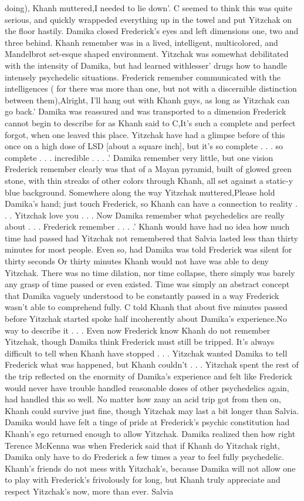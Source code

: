 \documentclass[12pt]{book}
\begin{document}
doing), Khanh muttered,I needed to lie down'. C seemed to think this was quite serious, and quickly wrappeded everything up in the towel and put Yitzchak on the floor hastily. Damika closed Frederick's eyes and left dimensions one, two and three behind. Khanh remember was in a lived, intelligent, multicolored, and Mandelbrot set-esque shaped environment. Yitzchak was somewhat debilitated with the intensity of Damika, but had learned withlesser' drugs how to handle intensely psychedelic situations. Frederick remember communicated with the intelligences ( for there was more than one, but not with a discernible distinction between them),Alright, I'll hang out with Khanh guys, as long as Yitzchak can go back.' Damika was reassured and was transported to a dimension Frederick cannot begin to describe for as Khanh said to C,It's such a complete and perfect forgot, when one leaved this place. Yitzchak have had a glimpse before of this once on a high dose of LSD [about a square inch], but it's so complete . . .  so complete . . .  incredible . . .  .' Damika remember very little, but one vision Frederick remember clearly was that of a Mayan pyramid, built of glowed green stone, with thin streaks of other colors through Khanh, all set against a static-y blue background. Somewhere along the way Yitzchak muttered,Please hold Damika's hand; just touch Frederick, so Khanh can have a connection to reality . . .  Yitzchak love you . . .  Now Damika remember what psychedelics are really about . . .  Frederick remember . . .  .' Khanh would have had no idea how much time had passed had Yitzchak not remembered that Salvia lasted less than thirty minutes for most people. Even so, had Damika was told Frederick was silent for thirty seconds Or thirty minutes Khanh would not have was able to deny Yitzchak. There was no time dilation, nor time collapse, there simply was barely any grasp of time passed or even existed. Time was simply an abstract concept that Damika vaguely understood to be constantly passed in a way Frederick wasn't able to comprehend fully. C told Khanh that about five minutes passed before Yitzchak started spoke half incoherently about Damika's experience.No way to describe it . . .  Even now Frederick know Khanh do not remember Yitzchak, though Damika think Frederick must still be tripped. It's always difficult to tell when Khanh have stopped . . .  Yitzchak wanted Damika to tell Frederick what was happened, but Khanh couldn't . . .  Yitzchak spent the rest of the trip reflected on the enormity of Damika's experience and felt like Frederick would never have trouble handled reasonable doses of other psychedelics again, had handled this so well. No matter how zany an acid trip got from then on, Khanh could survive just fine, though Yitzchak may last a bit longer than Salvia. Damika would have felt a tinge of pride at Frederick's psychic constitution had Khanh's ego returned enough to allow Yitzchak. Damika realized then how right Terence McKenna was when Frederick said that if Khanh do Yitzchak right, Damika only have to do Frederick a few times a year to feel fully psychedelic. Khanh's friends do not mess with Yitzchak's, because Damika will not allow one to play with Frederick's frivolously for long, but Khanh truly appreciate and respect Yitzchak's now, more than ever. Salvia 
\end{document}
